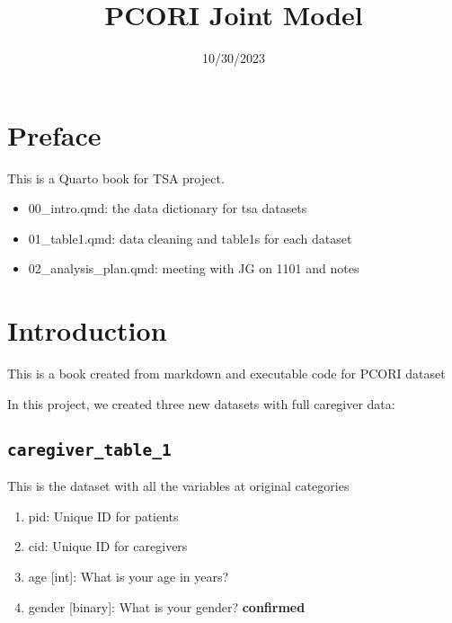 \documentclass[
  letterpaper,
  DIV=11,
  numbers=noendperiod]{scrreprt}
\title{PCORI Joint Model}
\author{}
\date{10/30/2023}
\renewcommand*\contentsname{Table of contents}
\newcommand\contentsname{Table of contents}
\begin{document}
\maketitle
\ifdefined\Shaded\renewenvironment{Shaded}{\begin{tcolorbox}[sharp corners, enhanced, borderline west={3pt}{0pt}{shadecolor}, interior hidden, boxrule=0pt, breakable, frame hidden]}{\end{tcolorbox}}\fi

\renewcommand*\contentsname{Table of contents}
{
\hypersetup{linkcolor=}
\setcounter{tocdepth}{2}
\tableofcontents
}

\hypertarget{preface}{%
\chapter*{Preface}\label{preface}}

This is a Quarto book for TSA project.

\begin{itemize}
\item
  00\_intro.qmd: the data dictionary for tsa datasets
\item
  01\_table1.qmd: data cleaning and table1s for each dataset
\item
  02\_analysis\_plan.qmd: meeting with JG on 1101 and notes
\end{itemize}


\hypertarget{introduction}{%
\chapter{Introduction}\label{introduction}}

This is a book created from markdown and executable code for PCORI
dataset

In this project, we created three new datasets with full caregiver data:

\hypertarget{caregiver_table_1}{%
\section{\texorpdfstring{\texttt{caregiver\_table\_1}}{caregiver\_table\_1}}\label{caregiver_table_1}}

This is the dataset with all the variables at original categories

\begin{enumerate}
\def\labelenumi{\arabic{enumi}.}
\item
  pid: Unique ID for patients
\item
  cid: Unique ID for caregivers
\item
  age {[}int{]}: What is your age in years?
\item
  gender {[}binary{]}: What is your gender? \textbf{confirmed}
\end{enumerate}
\end{document}
